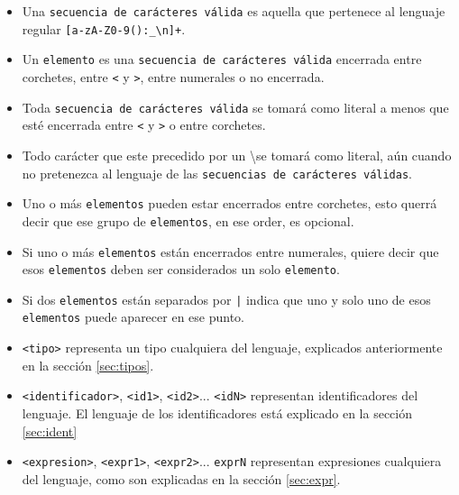 \documentclass[12pt, spanish]{report}
\begin{document}
\begin{itemize}
 \item Una \texttt{secuencia de car\'acteres v\'alida} es aquella que pertenece al
       lenguaje regular \texttt{[a-zA-Z0-9():\_\textbackslash n]+}.
       
 \item Un \texttt{elemento} es una \texttt{secuencia de car\'acteres v\'alida} encerrada
       entre corchetes, entre \texttt{<} y \texttt{>}, entre numerales o
       no encerrada.
       
 \item Toda \texttt{secuencia de car\'acteres v\'alida} se tomar\'a como literal a menos
       que est\'e encerrada entre \texttt{<} y \texttt{>} o entre corchetes.

 \item Todo car\'acter que este precedido por un \textbackslash se
       tomar\'a como literal, a\'un cuando no pretenezca al lenguaje de
       las \texttt{secuencias de car\'acteres v\'alidas}.
       
 \item Uno o m\'as \texttt{elementos} pueden estar encerrados entre corchetes,
       esto querr\'a decir que ese grupo de \texttt{elementos}, en ese order, es
       opcional.
       
 \item Si uno o m\'as \texttt{elementos} est\'an encerrados entre numerales,
       quiere decir que esos \texttt{elementos} deben ser considerados un solo 
       \texttt{elemento}.
       
 \item Si dos \texttt{elementos} est\'an separados por \texttt{|} indica que uno y
       solo uno de esos \texttt{elementos} puede aparecer en ese punto.
       
 \item \texttt{<tipo>} representa un tipo cualquiera del lenguaje,
       explicados anteriormente en la secci\'on \ref{sec:tipos}.
       
 \item \texttt{<identificador>}, \texttt{<id1>}, \texttt{<id2>}...
       \texttt{<idN>} representan identificadores del lenguaje. El
       lenguaje de los identificadores est\'a explicado en la secci\'on \ref{sec:ident}
       
 \item \texttt{<expresion>}, \texttt{<expr1>}, \texttt{<expr2>}...
       \texttt{exprN} representan expresiones cualquiera del lenguaje, como
       son explicadas en la secci\'on \ref{sec:expr}.
       

\end{itemize}
\end{document}
